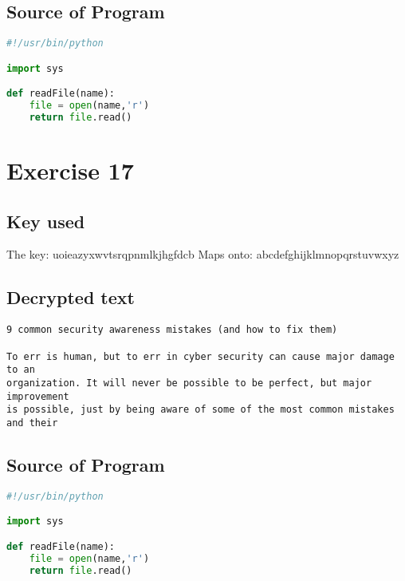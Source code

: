 \documentclass[a4paper]{article}
\begin{document}
\subsection*{Source of Program}

\begin{lstlisting}[language=Python]
#!/usr/bin/python

import sys

def readFile(name):
	file = open(name,'r')
	return file.read()

\end{lstlisting}

\section*{Exercise 17}

\subsection*{Key used}
The key:
uoieazyxwvtsrqpnmlkjhgfdcb\newline
Maps onto: \newline
abcdefghijklmnopqrstuvwxyz\newline

\subsection*{Decrypted text}

\begin{verbatim}
9 common security awareness mistakes (and how to fix them)

To err is human, but to err in cyber security can cause major damage to an
organization. It will never be possible to be perfect, but major improvement
is possible, just by being aware of some of the most common mistakes and their
\end{verbatim}

\subsection*{Source of Program}

\begin{lstlisting}[language=Python]
#!/usr/bin/python

import sys

def readFile(name):
	file = open(name,'r')
	return file.read()

\end{lstlisting}
\end{document}
